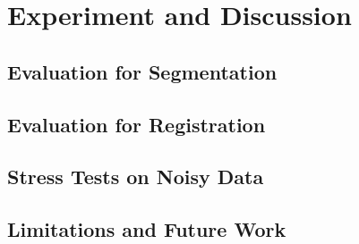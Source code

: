 \section{Experiment and Discussion}
\subsection{Evaluation for Segmentation}
\subsection{Evaluation for Registration}
\subsection{Stress Tests on Noisy Data}
\subsection{Limitations and Future Work}
